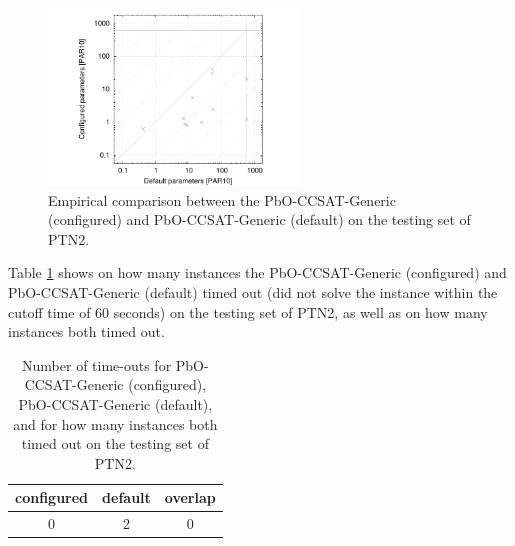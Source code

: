 \documentclass[british]{article}
\newif\ifruntime
\begin{document}
    \begin{figure}[htbp]
        \noindent
        \begin{centering}
            \includegraphics[width=0.6\textwidth]{data_PbO-CCSAT-Generic_configured_vs_default_on_PTN2_test}
            \par
        \end{centering}

       \caption{Empirical comparison between the PbO-CCSAT-Generic (configured) and PbO-CCSAT-Generic (default) on the testing set of PTN2.}\label{fig:configured_vs_default_test}
    \end{figure}


        Table \ref{tbl:timeouts_test} shows on how many instances the PbO-CCSAT-Generic (configured) and PbO-CCSAT-Generic (default) timed out (did not solve the instance within the cutoff time of 60 seconds) on the testing set of PTN2, as well as on how many instances both timed out.

        \begin{table}[htbp]
            \begin{center}
                \begin{tabular}{ccc}
                    configured & default & overlap \\ \hline
                    0 & 2 & 0
                \end{tabular}
            \end{center}
            \caption{Number of time-outs for PbO-CCSAT-Generic (configured), PbO-CCSAT-Generic (default), and for how many instances both timed out on the testing set of PTN2.}
            \label{tbl:timeouts_test}
        \end{table}


\fi %
\end{document}
